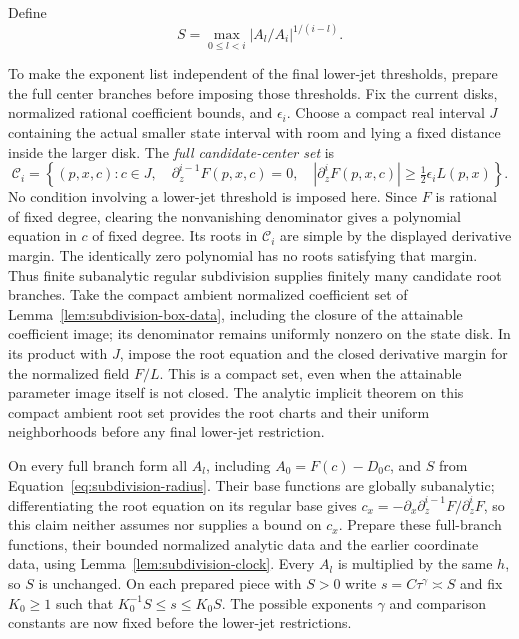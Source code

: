 Define
\begin{equation}
\label{eq:subdivision-radius}
 S=\max_{0\le l<i}|A_l/A_i|^{1/(i-l)}.
\end{equation}

To make the exponent list independent of the final lower-jet thresholds,
prepare the full center branches before imposing those thresholds.
Fix the current disks, normalized rational coefficient bounds,
and $\epsilon_i$.  Choose a compact real interval $J$ containing the
actual smaller state interval with room and lying a fixed distance
inside the larger disk.  The \emph{full candidate-center set} is
\begin{equation}
\label{eq:subdivision-candidate-centers}
 \mathcal C_i=
 \left\{(p,x,c):c\in J,\quad
 \partial_z^{i-1}F(p,x,c)=0,\quad
 |\partial_z^iF(p,x,c)|\ge\tfrac12\epsilon_iL(p,x)\right\}.
\end{equation}
No condition involving a lower-jet threshold is imposed here.  Since
$F$ is rational of fixed degree, clearing the nonvanishing denominator
gives a polynomial equation in $c$ of fixed degree.  Its roots in
$\mathcal C_i$ are simple by the displayed derivative margin.
The identically zero polynomial has no roots satisfying that margin.
Thus finite subanalytic regular subdivision supplies finitely many
candidate root branches.  Take the compact ambient normalized
coefficient set of Lemma~\ref{lem:subdivision-box-data}, including the
closure of the attainable coefficient image; its denominator remains
uniformly nonzero on the state disk.  In its product with $J$, impose
the root equation and the closed derivative margin for the normalized
field $F/L$.  This is a compact set, even when the attainable parameter
image itself is not closed.  The analytic implicit theorem on this
compact ambient root set provides the root charts and their uniform
neighborhoods before any final lower-jet restriction.

On every full branch form all $A_l$, including
$A_0=F(c)-D_0c$, and $S$ from
Equation~\eqref{eq:subdivision-radius}.  Their base functions are
globally subanalytic; differentiating the root equation on its regular
base gives $c_x=-\partial_x\partial_z^{i-1}F/\partial_z^iF$, so this
claim neither assumes nor supplies a bound on $c_x$.
Prepare these full-branch functions, their bounded normalized analytic
data and the earlier coordinate data, using
Lemma~\ref{lem:subdivision-clock}.  Every $A_l$ is multiplied by the
same $h$, so $S$ is unchanged.  On each prepared piece with $S>0$ write
$s=C\tau^\gamma\asymp S$ and fix $K_0\ge1$ such that
$K_0^{-1}S\le s\le K_0S$.  The possible exponents $\gamma$ and
comparison constants are now fixed before the lower-jet restrictions.

